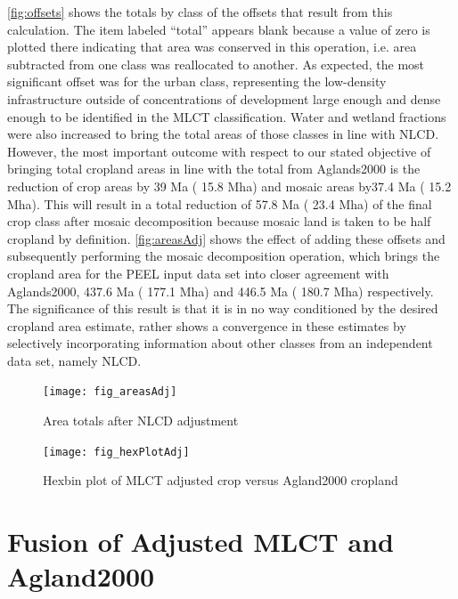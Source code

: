 \autoref{fig:offsets} shows the totals by class of the offsets that
result from this calculation.  The item labeled ``total'' appears
blank because a value of zero is plotted there indicating that area
was conserved in this operation, i.e. area subtracted from one class
was reallocated to another.  As expected, the most significant offset
was for the urban class, representing the low-density infrastructure
outside of concentrations of development large enough and dense enough
to be identified in the MLCT classification.  Water and wetland
fractions were also increased to bring the total areas of those
classes in line with NLCD.  However, the most important outcome with
respect to our stated objective of bringing total cropland areas in
line with the total from Aglands2000 is the reduction of crop areas by
39 Ma ( 15.8 Mha) and mosaic areas
by37.4 Ma ( 15.2 Mha).  This will
result in a total reduction of
57.8 Ma ( 23.4 Mha)
of the final crop class after mosaic decomposition because mosaic land
is taken to be half cropland by definition.  \autoref{fig:areasAdj}
shows the effect of adding these offsets and subsequently performing
the mosaic decomposition operation, which brings the cropland area for
the PEEL input data set into closer agreement with Aglands2000,
437.6 Ma ( 177.1 Mha) and
446.5 Ma ( 180.7 Mha) respectively. The
significance of this result is that it is in no way conditioned by the
desired cropland area estimate, rather shows a convergence in these
estimates by selectively incorporating information about other classes
from an independent data set, namely NLCD.

\begin{figure}[hpt]
  \centering


  \texttt{[image: fig\_areasAdj]}
  \caption{Area totals after NLCD adjustment}
  \label{fig:areasAdj}
\end{figure}


\begin{figure}[hpt] 
  \centering

    \texttt{[image: fig\_hexPlotAdj]}
  \caption{Hexbin plot of MLCT adjusted crop versus Agland2000 cropland}
  \label{fig:hexPlotAdj} 
\end{figure} 


\section{Fusion of Adjusted MLCT and Agland2000}
\label{sec:fusion}




